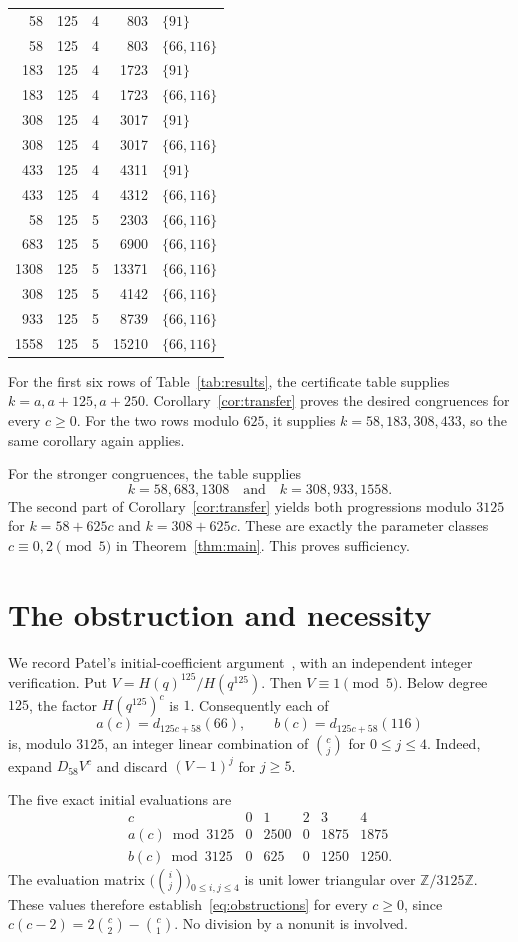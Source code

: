 \documentclass[11pt]{article}
\newcommand{\Z}{\mathbb Z}
\begin{document}
\begin{longtable}{rrrrl}
58&125&4&803&$\{91\}$\\
58&125&4&803&$\{66,116\}$\\
183&125&4&1723&$\{91\}$\\
183&125&4&1723&$\{66,116\}$\\
308&125&4&3017&$\{91\}$\\
308&125&4&3017&$\{66,116\}$\\
433&125&4&4311&$\{91\}$\\
433&125&4&4312&$\{66,116\}$\\
58&125&5&2303&$\{66,116\}$\\
683&125&5&6900&$\{66,116\}$\\
1308&125&5&13371&$\{66,116\}$\\
308&125&5&4142&$\{66,116\}$\\
933&125&5&8739&$\{66,116\}$\\
1558&125&5&15210&$\{66,116\}$\\
\bottomrule
\end{longtable}

For the first six rows of Table~\ref{tab:results}, the certificate table supplies $k=a,a+125,a+250$. Corollary~\ref{cor:transfer} proves the desired congruences for every $c\ge0$. For the two rows modulo $625$, it supplies $k=58,183,308,433$, so the same corollary again applies.

For the stronger congruences, the table supplies
\[
 k=58,683,1308\quad\text{and}\quad k=308,933,1558.
\]
The second part of Corollary~\ref{cor:transfer} yields both progressions modulo $3125$ for $k=58+625c$ and $k=308+625c$. These are exactly the parameter classes $c\equiv0,2\pmod5$ in Theorem~\ref{thm:main}. This proves sufficiency.

\section{The obstruction and necessity}
We record Patel's initial-coefficient argument~\cite{Patel}, with an independent integer verification. Put $V=H(q)^{125}/H(q^{125})$. Then $V\equiv1\pmod5$. Below degree $125$, the factor $H(q^{125})^c$ is $1$. Consequently each of
\[
 a(c)=d_{125c+58}(66),\qquad b(c)=d_{125c+58}(116)
\]
is, modulo $3125$, an integer linear combination of $\binom cj$ for $0\le j\le4$. Indeed, expand $D_{58}V^c$ and discard $(V-1)^j$ for $j\ge5$.

The five exact initial evaluations are
\[
\begin{array}{c|rrrrr}
c&0&1&2&3&4\\\hline
a(c)\bmod3125&0&2500&0&1875&1875\\
b(c)\bmod3125&0&625&0&1250&1250.
\end{array}
\]
The evaluation matrix $\bigl(\binom ij\bigr)_{0\le i,j\le4}$ is unit lower triangular over $\Z/3125\Z$. These values therefore establish~\eqref{eq:obstructions} for every $c\ge0$, since $c(c-2)=2\binom c2-\binom c1$. No division by a nonunit is involved.
\end{document}
